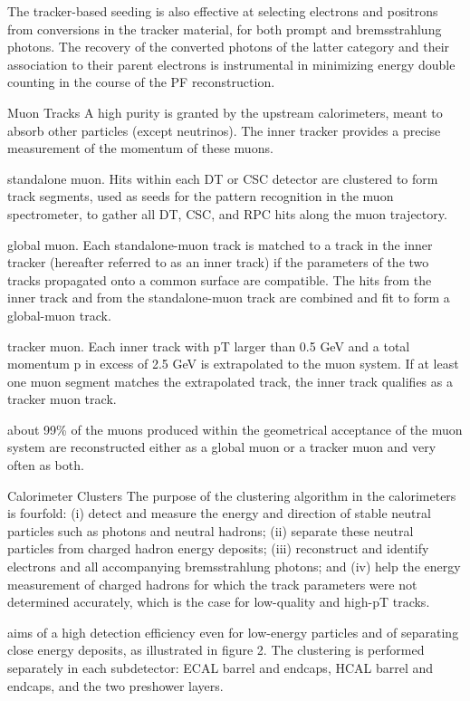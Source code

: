 The tracker-based seeding is also effective at selecting electrons and positrons from conversions in the tracker material, for both prompt and bremsstrahlung photons. The recovery of the converted photons of the latter category and their association to their parent electrons is instrumental in minimizing energy double counting in the course of the PF reconstruction.


Muon Tracks
A high purity is granted by the upstream calorimeters, meant to absorb other particles (except neutrinos). The inner tracker provides a precise measurement of the momentum of these muons.

standalone muon. Hits within each DT or CSC detector are clustered to form track segments, used as seeds for the pattern recognition in the muon spectrometer, to gather all DT, CSC, and RPC hits along the muon trajectory.

global muon. Each standalone-muon track is matched to a track in the inner tracker (hereafter referred to as an inner track) if the parameters of the two tracks propagated onto a common surface are compatible. The hits from the inner track and from the standalone-muon track are combined and fit to form a global-muon track.

tracker muon. Each inner track with pT larger than 0.5 GeV and a total momentum p in excess of 2.5 GeV is extrapolated to the muon system. If at least one muon segment matches the extrapolated track, the inner track qualifies as a tracker muon track.

about 99\% of the muons produced within the geometrical acceptance of the muon system are reconstructed either as a global muon or a tracker muon and very often as both.


Calorimeter Clusters
The purpose of the clustering algorithm in the calorimeters is fourfold: (i) detect and measure the energy and direction of stable neutral particles such as photons and neutral hadrons; (ii) separate these neutral particles from charged hadron energy deposits; (iii) reconstruct and identify electrons and all accompanying bremsstrahlung photons; and (iv) help the energy measurement of charged hadrons for which the track parameters were not determined accurately, which is the case for low-quality and high-pT tracks.

aims of a high detection efficiency even for low-energy particles and of separating close energy deposits, as illustrated in figure 2. The clustering is performed separately in each subdetector: ECAL barrel and endcaps, HCAL barrel and endcaps, and the two preshower layers.

